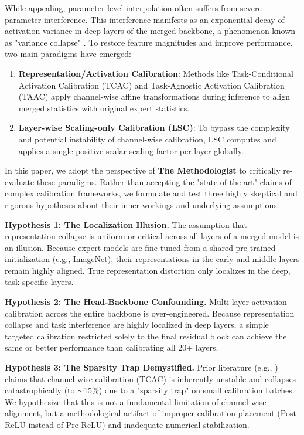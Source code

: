 \documentclass{article}
\theoremstyle{plain}
\theoremstyle{definition}
\theoremstyle{remark}
\begin{document}
While appealing, parameter-level interpolation often suffers from severe parameter interference. This interference manifests as an exponential decay of activation variance in deep layers of the merged backbone, a phenomenon known as "variance collapse" \cite{jordan2022repair,taac2026}. To restore feature magnitudes and improve performance, two main paradigms have emerged:
\begin{enumerate}
    \item \textbf{Representation/Activation Calibration}: Methods like Task-Conditional Activation Calibration (TCAC) \cite{tcac2026} and Task-Agnostic Activation Calibration (TAAC) \cite{taac2026} apply channel-wise affine transformations during inference to align merged statistics with original expert statistics.
    \item \textbf{Layer-wise Scaling-only Calibration (LSC)}: To bypass the complexity and potential instability of channel-wise calibration, LSC \cite{lsc2026} computes and applies a single positive scalar scaling factor per layer globally.
\end{enumerate}

In this paper, we adopt the perspective of \textbf{The Methodologist} to critically re-evaluate these paradigms. Rather than accepting the "state-of-the-art" claims of complex calibration frameworks, we formulate and test three highly skeptical and rigorous hypotheses about their inner workings and underlying assumptions:

\textbf{Hypothesis 1: The Localization Illusion.} The assumption that representation collapse is uniform or critical across all layers of a merged model is an illusion. Because expert models are fine-tuned from a shared pre-trained initialization (e.g., ImageNet), their representations in the early and middle layers remain highly aligned. True representation distortion only localizes in the deep, task-specific layers.

\textbf{Hypothesis 2: The Head-Backbone Confounding.} Multi-layer activation calibration across the entire backbone is over-engineered. Because representation collapse and task interference are highly localized in deep layers, a simple targeted calibration restricted solely to the final residual block can achieve the same or better performance than calibrating all 20+ layers.

\textbf{Hypothesis 3: The Sparsity Trap Demystified.} Prior literature (e.g., \cite{lsc2026}) claims that channel-wise calibration (TCAC) is inherently unstable and collapses catastrophically (to $\sim$15\%) due to a "sparsity trap" on small calibration batches. We hypothesize that this is not a fundamental limitation of channel-wise alignment, but a methodological artifact of improper calibration placement (Post-ReLU instead of Pre-ReLU) and inadequate numerical stabilization.
\end{document}
